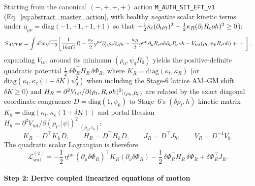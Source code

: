 Starting from the canonical $(-,+,+,+)$ action \texttt{M\_AUTH\_SIT\_EFT\_v1} (Eq.~\eqref{eq:abstract_master_action}, with healthy \emph{negative} scalar kinetic terms under $\eta_{\mu\nu} = \mathrm{diag}(-1,+1,+1,+1)$ so that $+\frac{1}{2}\kappa_t(\partial_t\rho_t)^2 + \frac{1}{2}\kappa_R(\partial_tR_coh)^2 \ge 0$):
\[
S_{AUTH} = \int d^4x \sqrt{-g} \left[
\frac{1}{16\pi G} R
- \frac{\kappa_t}{2} g^{\mu\nu} \partial_\mu \rho_t \partial_\nu \rho_t
- \frac{\kappa_R}{2} g^{\mu\nu} \partial_\mu R_coh \partial_\nu R_coh
- V_{tot}(\rho_t, \psi_0 R_coh)
+ \cdots \right],
\]
expanding $V_{\mathrm{tot}}$ around its minimum $(\rho_0, \psi_0 R_0)$ yields the positive-definite quadratic potential $\frac{1}{2}\,\delta\Phi_R^\top H_R\,\delta\Phi_R$, where $K_R = \mathrm{diag}(\kappa_t, \kappa_R)$ (or $\mathrm{diag}(\kappa_t, \kappa_c(1+\delta K)\psi_0^2)$ when including the Stage-6 lattice AM--GM shift $\delta K \ge 0$) and $H_R = \partial^2 V_{tot}/\partial(\rho_t, R_coh)^2|_{(\rho_0, R_0)}$ are related by the exact diagonal coordinate congruence $D = \mathrm{diag}(1, \psi_0)$ to Stage~6's $(\delta\rho_t, h)$ kinetic matrix $K_h = \mathrm{diag}(\kappa_t, \kappa_c(1+\delta K))$ and portal Hessian $H_h = \partial^2 V_{\mathrm{tot}}/\partial(\rho_t, |\psi|)^2|_{(\rho_0, v_0)}$:
\[
K_R = D^\top K_h D, \qquad H_R = D^\top H_h D, \qquad J_R = D^\top J_h, \qquad V_R = D^{-1} V_h.
\]
The quadratic scalar Lagrangian is therefore
\[
\mathcal{L}^{(2)}_{\mathrm{scal}} = -\frac{1}{2}\,\eta^{\mu\nu}\,(\partial_\mu\delta\Phi_R)^\top K_R (\partial_\nu\delta\Phi_R) - \frac{1}{2}\,\delta\Phi_R^\top H_R\,\delta\Phi_R + \delta\Phi_R^\top J_R.
\]

\paragraph{Step 2: Derive coupled linearized equations of motion}

